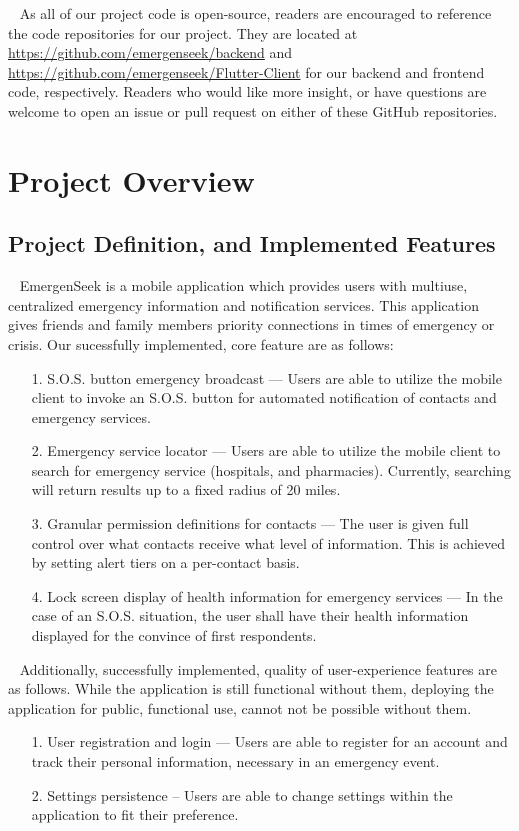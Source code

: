 \documentclass[10pt, a4paper]{article}
\begin{document}
\par ~ As all of our project code is open-source, readers are encouraged to reference the code repositories for our project. They are located at \url{https://github.com/emergenseek/backend} and \url{https://github.com/emergenseek/Flutter-Client} for our backend and frontend code, respectively. Readers who would like more insight, or have questions are welcome to open an issue or pull request on either of these GitHub repositories.

\section{Project Overview}
\subsection{Project Definition, and Implemented Features}
\par ~ EmergenSeek is a mobile application which provides users with multiuse, centralized emergency information and notification services. This application gives friends and family members priority connections in times of emergency or crisis. Our sucessfully implemented, core feature are as follows:

\begin{enumerate}
	\item[1.] S.O.S. button emergency broadcast --- Users are able to utilize the mobile client to invoke an S.O.S. button for automated notification of contacts and emergency services. 
	\item[2.] Emergency service locator --- Users are able to utilize the mobile client to search for emergency service (hospitals, and pharmacies). Currently, searching will return results up to a fixed radius of 20 miles.
	\item[3.] Granular permission definitions for contacts --- The user is given full control over what contacts receive what level of information. This is achieved by setting alert tiers on a per-contact basis.
	\item[4.] Lock screen display of health information for emergency services --- In the case of an S.O.S. situation, the user shall have their health information displayed for the convince of first respondents.
\end{enumerate}

\par ~ Additionally, successfully implemented, quality of user-experience features are as follows. While the application is still functional without them, deploying the application for public, functional use, cannot not be possible without them.
\begin{enumerate}
	\item[1.] User registration and login --- Users are able to register for an account and track their personal information, necessary in an emergency event.
	\item[2.] Settings persistence -- Users are able to change settings within the application to fit their preference.
\end{enumerate}
\end{document}
